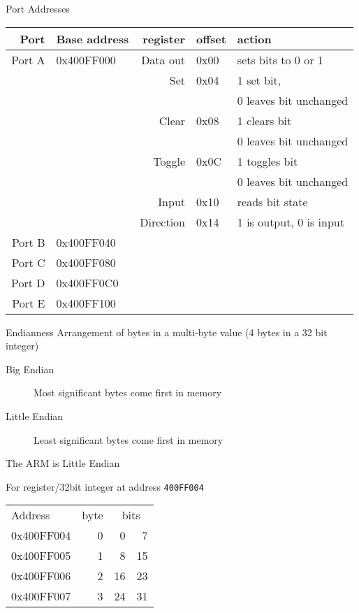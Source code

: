 \documentclass[xcolor=svgnames]{beamer}
\begin{document}
\begin{frame}{Port Addresses}
\begin{tabular}{rlrll}
    Port & Base address & register & offset & action\\\toprule
    Port A & 0x400FF000 & Data out & 0x00 & sets bits to 0 or 1\\
                    &&    Set      & 0x04 & 1 set bit,\\
                    &&&& 0 leaves bit unchanged \\
                    &&    Clear    & 0x08 & 1 clears bit \\
                    &&&& 0 leaves bit unchanged \\
                    &&    Toggle   & 0x0C & 1 toggles bit \\
                    &&&& 0 leaves bit unchanged \\
                    &&    Input    & 0x10 & reads bit state\\
                    &&   Direction & 0x14 & 1 is output, 0 is input \\\midrule
    Port B & 0x400FF040\\
    Port C & 0x400FF080\\
    Port D & 0x400FF0C0\\
    Port E & 0x400FF100\\
    \end{tabular}
\end{frame}

\begin{frame}{Endianness}
    Arrangement of bytes in a multi-byte value (4 bytes in a 32 bit integer)
\begin{description}
    \item[Big Endian] Most significant bytes come first in memory
    \item[Little Endian] Least significant bytes come first in memory
\end{description}
The ARM is \alert{Little} Endian
\begin{exampleblock}{For register/32bit integer at address \alert{\texttt{400FF004}}}
\begin{tabular}{lrr@{~--~}r}
Address & byte & \multicolumn{2}{c}{bits}\\
0x400FF004 &  0 &  0 & 7 \\
0x400FF005 &  1 &  8 & 15 \\
0x400FF006 &  2 &  16 & 23 \\
0x400FF007 &  3 &  24 & 31 \\
\end{tabular}
\end{exampleblock}
\end{frame}
\end{document}
